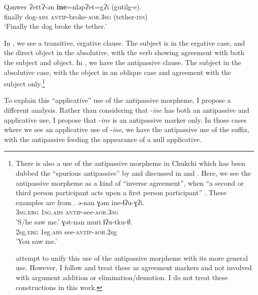 \documentclass[output=paper,colorlinks,citecolor=brown,modfonts,nonflat]{langsci/langscibook}
\begin{document}
    \ex \label{ex:basilico:2b}
    \gll Qǝnwer  ɁettɁ-ǝn  \textbf{ine}=nlǝpɁet=gɁi  (gutilg-e).\\
    finally  dog-\textsc{abs}  \textsc{antip}{}-broke-\textsc{aor}.\textsc{3sg}  (tether-\textsc{ins})\\
    \glt ‘Finally the dog broke the tether.’
    \z
    \z


In , we see a transitive, ergative clause. The subject is in the ergative case, and the direct object in the absolutive, with the verb showing agreement with both the subject and object. In , we have the antipassive clause. The subject in the absolutive case, with the object in an oblique case and agreement with the subject only.\footnote{There is also a use of the antipassive morpheme in Chukchi which has been dubbed the ``spurious antipassive'' by \citet{Hale2002} and discussed in \citet{BobaljikBranigan2006} and \citet{Bobaljik2007}. Here, we see the antipassive morpheme as a kind of ``inverse agreement'', when “a second or third person participant acts upon a first person participant” \citep{Polinsky2016}. These examples are from \citet{Polinsky2016}.
\ea \label{ex:basilico:fn}
\gll ə-nan ɣəm ine-ɬʔu-ɣʔi. \\
3\textsc{sg.\textsc{erg}} 1\textsc{sg.\textsc{abs}} \textsc{antip}-see-\textsc{{aor}}.3\textsc{sg}\\
\glt  'S/he saw me.'
\z
\ea \label{ex:basilico:fn2}
\gll ɣət-nan   muri     ɬʔu-tku-\textrm{${\emptyset}$}.    \\
2\textrm{sg}.\textrm{\textsc{erg}}  1\textrm{sg.\textsc{abs}} see-\textrm{\textsc{antip}-\textsc{aor}}.2\textrm{sg}\\
\glt 'You saw me.'
\z

\citet{BobaljikBranigan2006} attempt to unify this use of the antipassive morpheme with its more general use. However, I follow \citet{Polinsky2016} and treat these as agreement markers and not involved with argument addition or elimination/demotion. I do not treat these constructions in this work.}

To explain this ``applicative'' use of the antipassive morpheme, I propose a different analysis. Rather than considering that -\textit{ine} has both an antipassive and applicative use, I propose that -\textit{ine} is an antipassive marker only. In those cases where we see an applicative use of -\textit{ine}, we have the antipassive use of the suffix, with the antipassive feeding the appearance of a null applicative.
\end{document}
